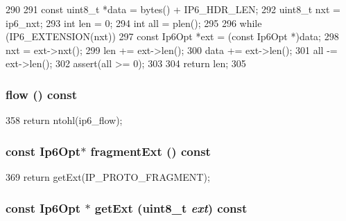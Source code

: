 \begin{DoxyCode}
290 {
291     const uint8_t *data = bytes() + IP6_HDR_LEN;
292     uint8_t nxt = ip6_nxt;
293     int len = 0;
294     int all = plen();
295 
296     while (IP6_EXTENSION(nxt)) {
297         const Ip6Opt *ext = (const Ip6Opt *)data;
298         nxt = ext->nxt();
299         len += ext->len();
300         data += ext->len();
301         all -= ext->len();
302         assert(all >= 0);
303     }
304     return len;
305 }
\end{DoxyCode}
\hypertarget{structNet_1_1Ip6Hdr_abd45f80ddf5023fd59eeb0812111da65}{
\subsubsection[{flow}]{ flow () const}}
\label{structNet_1_1Ip6Hdr_abd45f80ddf5023fd59eeb0812111da65}



\begin{DoxyCode}
358 { return ntohl(ip6_flow); }
\end{DoxyCode}
\hypertarget{structNet_1_1Ip6Hdr_a8c75a1a568b300b2ba9952ccdc5bd66e}{
\subsubsection[{fragmentExt}]{\setlength{\rightskip}{0pt plus 5cm}const {\bf Ip6Opt}$\ast$ fragmentExt () const}}
\label{structNet_1_1Ip6Hdr_a8c75a1a568b300b2ba9952ccdc5bd66e}



\begin{DoxyCode}
369 { return getExt(IP_PROTO_FRAGMENT); }
\end{DoxyCode}
\hypertarget{structNet_1_1Ip6Hdr_a260c2330d0e33c41c2f44baf15f1badc}{
\subsubsection[{getExt}]{\setlength{\rightskip}{0pt plus 5cm}const {\bf Ip6Opt} $\ast$ getExt (uint8\_\-t {\em ext}) const}}
\label{structNet_1_1Ip6Hdr_a260c2330d0e33c41c2f44baf15f1badc}



